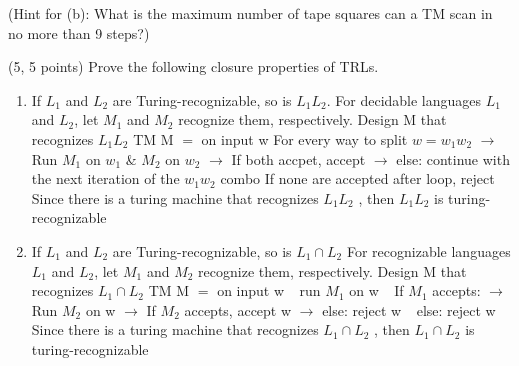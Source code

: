 \documentclass[11pt]{article}
\begin{document}
(Hint for (b): What is the maximum number of tape squares can a TM scan in no more than 9 steps?)

\item (5, 5 points) Prove the following closure properties of TRLs.
\begin{enumerate}
\item If $L_1$ and $L_2$ are Turing-recognizable, so is $L_1L_2$.
\newline For decidable languages $L_1$ and $L_2$, let $M_1$ and $M_2$ recognize them, respectively. 
Design M that recognizes $L_1L_2$\newline 
TM M $=$ on input w \newline
For every way to split $w = w_1 w_2$ \newline 
$\rightarrow$ Run $M_1$ on $w_1$ & $M_2$ on $w_2$ \newline 
$\rightarrow$ If both accpet, accept \newline
$\rightarrow$ else: continue with the next iteration of the $w_1 w_2$ combo\newline 
If none are accepted after loop, reject \newline \newline 
Since there is a turing machine that recognizes $L_1 L_2$  , then $L_1 L_2$  is turing-recognizable

\item If $L_1$ and $L_2$ are Turing-recognizable, so is $L_1\cap L_2$
\newline For recognizable languages $L_1$ and $L_2$, let $M_1$ and $M_2$ recognize them, respectively. 
Design M that recognizes $L_1\cap L_2$ \newline 
TM M $=$ on input w \newline \newline  
$\ \ $ run $M_1$ on w \newline 
$\ \ $ If $M_1$ accepts:\newline 
$\rightarrow$ Run $M_2$ on w \newline 
$\rightarrow$ If $M_2$ accepts, accept w \newline 
$\rightarrow$ else: reject w\newline 
$\ \ $ else: reject w \newline \newline 
Since there is a turing machine that recognizes $L_1\cap L_2$ , then $L_1\cap L_2$  is turing-recognizable





\end{enumerate}
\end{document}
